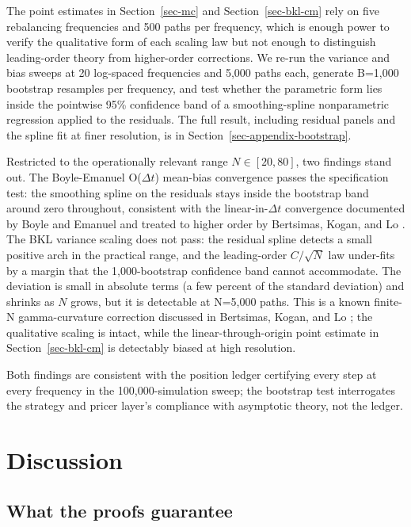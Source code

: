 \documentclass[
  11pt,
  letterpaper,
  DIV=12,
  numbers=noendperiod]{scrartcl}
\numberwithin{equation}{section}
\numberwithin{figure}{section}
\numberwithin{table}{section}
\let\quantproofsoldsection\section
\renewcommand{\section}{\clearpage\quantproofsoldsection}
\begin{document}
The point estimates in Section~\ref{sec-mc} and Section~\ref{sec-bkl-cm}
rely on five rebalancing frequencies and 500 paths per frequency, which
is enough power to verify the qualitative form of each scaling law but
not enough to distinguish leading-order theory from higher-order
corrections. We re-run the variance and bias sweeps at 20 log-spaced
frequencies and 5,000 paths each, generate B=1,000 bootstrap resamples
per frequency, and test whether the parametric form lies inside the
pointwise 95\% confidence band of a smoothing-spline nonparametric
regression  applied to the
residuals. The full result, including residual panels and the spline fit
at finer resolution, is in Section~\ref{sec-appendix-bootstrap}.

Restricted to the operationally relevant range \(N \in [20, 80]\), two
findings stand out. The Boyle-Emanuel O(\(\Delta t\)) mean-bias
convergence passes the specification test: the smoothing spline on the
residuals stays inside the bootstrap band around zero throughout,
consistent with the linear-in-\(\Delta t\) convergence documented by
Boyle and Emanuel  and treated to higher
order by Bertsimas, Kogan, and Lo .
The BKL variance scaling does not pass: the residual spline detects a
small positive arch in the practical range, and the leading-order
\(C/\sqrt{N}\) law under-fits by a margin that the 1,000-bootstrap
confidence band cannot accommodate. The deviation is small in absolute
terms (a few percent of the standard deviation) and shrinks as \(N\)
grows, but it is detectable at N=5,000 paths. This is a known finite-N
gamma-curvature correction discussed in Bertsimas, Kogan, and Lo
; the qualitative scaling is intact,
while the linear-through-origin point estimate in
Section~\ref{sec-bkl-cm} is detectably biased at high resolution.

Both findings are consistent with the position ledger certifying every
step at every frequency in the 100,000-simulation sweep; the bootstrap
test interrogates the strategy and pricer layer's compliance with
asymptotic theory, not the ledger.

\section{Discussion}\label{sec-discussion}

\subsection{What the proofs guarantee}\label{sec-proof-scope}
\end{document}
